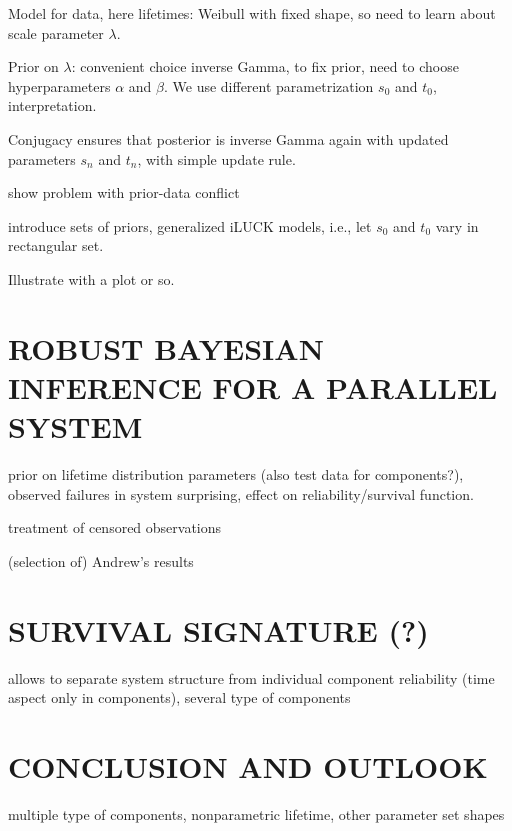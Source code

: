 \documentclass[12pt,a4paper,twocolumn,fleqn]{narms}
\begin{document}
Model for data, here lifetimes: Weibull with fixed shape,
so need to learn about scale parameter $\lambda$.

Prior on $\lambda$: convenient choice inverse Gamma,
to fix prior, need to choose hyperparameters $\alpha$ and $\beta$.
We use different parametrization $s_0$ and $t_0$, interpretation.

Conjugacy ensures that posterior is inverse Gamma again
with updated parameters $s_n$ and $t_n$,
with simple update rule.

show problem with prior-data conflict

introduce sets of priors, generalized iLUCK models, i.e.,
let $s_0$ and $t_0$ vary in rectangular set.

Illustrate with a plot or so.

\section{ROBUST BAYESIAN INFERENCE FOR A PARALLEL SYSTEM}

prior on lifetime distribution parameters (also test data for components?),
observed failures in system surprising,
effect on reliability/survival function.

treatment of censored observations


(selection of) Andrew's results


\section{SURVIVAL SIGNATURE (?)}

allows to separate system structure from individual component reliability (time aspect only in components),
several type of components

\section{CONCLUSION AND OUTLOOK}


multiple type of components, nonparametric lifetime, other parameter set shapes 




\end{document}

